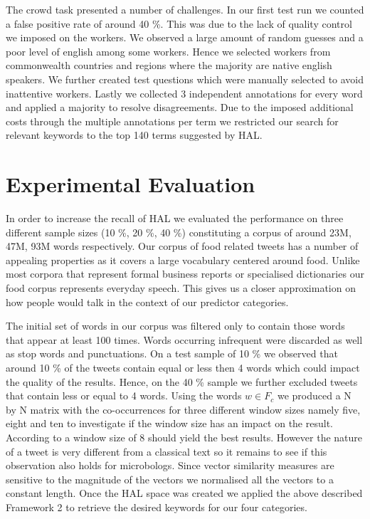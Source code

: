 The crowd task presented a number of challenges. In our first test run we counted a false positive rate of around 40 \%. This was due to the lack of quality control we imposed on the workers. We observed a large amount of random guesses and a poor level of english among some workers. Hence we selected workers from commonwealth countries and regions where the majority are native english speakers. We further created test questions which were manually selected to  avoid inattentive workers. Lastly we collected 3 independent annotations for every word and applied a majority to resolve disagreements. Due to the imposed additional costs through the multiple annotations per term we restricted our search for relevant keywords to the top 140 terms suggested by HAL.

\section{Experimental Evaluation}
\label{sec:exp_eval}

In order to increase the recall of HAL we evaluated the performance on three different sample sizes (10 \%, 20 \%, 40 \%) constituting a corpus of around 23M, 47M, 93M words respectively. Our corpus of food related tweets has a number of appealing properties as it covers a large vocabulary centered around food. Unlike most corpora that represent formal business reports or specialised dictionaries our food corpus represents everyday speech. This gives us a closer approximation on how people would talk in the context of our predictor categories. 

The initial set of words in our corpus was filtered only to contain those words that appear at least 100 times. Words occurring infrequent were discarded as well as stop words and punctuations. On a test sample of 10 \% we observed that around 10 \% of the tweets contain equal or less then 4 words which could impact the quality of the results. Hence, on the 40 \% sample we further excluded tweets that contain less or equal to 4 words. Using the words $w \in F_c$ we produced a N by N matrix with the co-occurrences for three different window sizes namely five, eight and ten to investigate if the window size has an impact on the result. According to \cite{lund96} a window size of 8 should yield the best results. However the nature of a tweet is very different from a classical text so it remains to see if this observation also holds for microbologs. Since vector similarity measures are sensitive to the magnitude of the vectors we normalised all the vectors to a constant length. Once the HAL space was created we applied the above described Framework 2 to retrieve the desired keywords for our four categories. 

